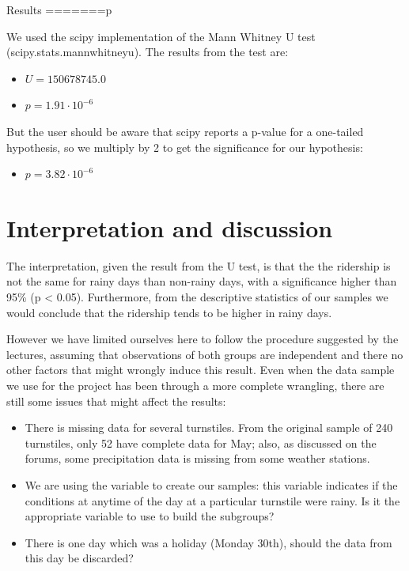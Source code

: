 \documentclass[a4paper,12pt,english]{sphinxmanual}
\begin{document}
Results
=======p

We used the scipy implementation of the Mann Whitney U test
(scipy.stats.mannwhitneyu). The results from the test are:
\begin{itemize}
\item {} 
\(U = 150678745.0\)

\item {} 
\(p = 1.91 \cdot 10^{-6}\)

\end{itemize}

But the user should be aware that scipy reports a p-value for a one-tailed
hypothesis, so we multiply by 2 to get the significance for our hypothesis:
\begin{itemize}
\item {} 
\(p = 3.82 \cdot 10^{-6}\)

\end{itemize}


\section{Interpretation and discussion}
\label{section1:interpretation-and-discussion}
The interpretation, given the result from the U test, is that the the ridership
is not the same for rainy days than non-rainy days, with a significance higher
than 95\% (p \textless{} 0.05). Furthermore, from the descriptive statistics of our samples
we would conclude that the ridership tends to be higher in rainy days.

However we have limited ourselves here to follow the procedure suggested by the
lectures, assuming that observations of both groups are independent and there
no other factors that might wrongly induce this result. Even when the data sample
we use for the project has been through a more complete wrangling, there are
still some issues that might affect the results:
\begin{itemize}
\item {} 
There is missing data for several turnstiles. From the original sample of 240
turnstiles, only 52 have complete data for May; also, as discussed on the
forums, some precipitation data is missing from some weather stations.

\item {} 
We are using the variable  to create our samples: this variable
indicates if the conditions at anytime of the day at a particular turnstile
were rainy. Is it the appropriate variable to use to build the subgroups?

\item {} 
There is one day which was a holiday (Monday 30th), should the data from this
day be discarded?

\end{itemize}
\end{document}
